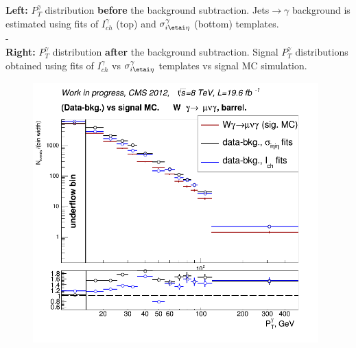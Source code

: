\begin{frame}
\begin{minipage}[b]{0.49\textwidth}
\begin{figure}[htb]
\begin{center}
    \end{center}
  \end{figure}
\end{minipage}%
\begin{minipage}[b]{0.49\textwidth}
\tiny
{\bfseries{Left:}} $P_T^{\gamma}$ distribution {\bfseries{before}} the background subtraction. Jets$\rightarrow\gamma$ background is estimated using fits of $I_{ch}^{\gamma}$ (top) and $\sigma_{i\etai\eta}^{\gamma}$ (bottom) templates.\\
-\\
{\bfseries{Right:}} $P_T^{\gamma}$ distribution {\bfseries{after}} the background subtraction. Signal $P_T^{\gamma}$ distributions obtained using fits of $I_{ch}^{\gamma}$ vs $\sigma_{i\etai\eta}^{\gamma}$ templates vs signal MC simulation.\\
  \begin{figure}[htb]
    \begin{center}
       \includegraphics[width=0.98\textwidth]{../figs/ForPresentation/forDefense_DATAminusBKG_Wg_Muon.png}\\
    \end{center}
  \end{figure}
\end{minipage}
\end{frame}%


